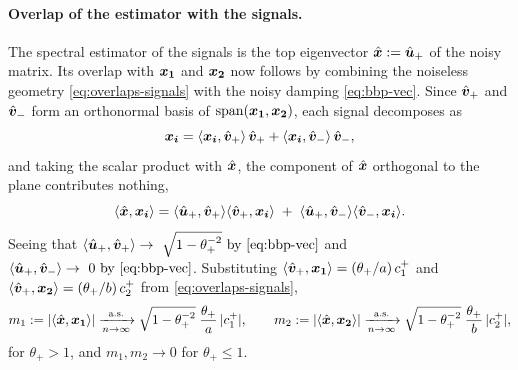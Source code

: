 \documentclass[11pt]{article}
\begin{document}
\paragraph{Overlap of the estimator with the signals.}
The spectral estimator of the signals is the top eigenvector $\hat{\bm{x}} := \hat{\bm{u}}_+$ of the noisy matrix. Its overlap with $\bm{x_1}$ and $\bm{x_2}$ now follows by combining the noiseless geometry \eqref{eq:overlaps-signals} with the noisy damping \eqref{eq:bbp-vec}. Since $\hat{\bm{v}}_+$ and $\hat{\bm{v}}_-$ form an orthonormal basis of $\operatorname{span}(\bm{x_1},\bm{x_2})$, each signal decomposes as
\[
    \bm{x_i} = \langle \bm{x_i}, \hat{\bm{v}}_+\rangle\, \hat{\bm{v}}_+ + \langle \bm{x_i}, \hat{\bm{v}}_-\rangle\, \hat{\bm{v}}_- ,
\]
and taking the scalar product with $\hat{\bm{x}}$, the component of $\hat{\bm{x}}$ orthogonal to the plane contributes nothing,
\[
    \langle \hat{\bm{x}}, \bm{x_i}\rangle
    =\langle \hat{\bm{u}}_+, \hat{\bm{v}}_+\rangle
      \langle \hat{\bm{v}}_+, \bm{x_i}\rangle
    \;+\; \langle \hat{\bm{u}}_+, \hat{\bm{v}}_-\rangle
      \langle \hat{\bm{v}}_-, \bm{x_i}\rangle .
\]
Seeing that $\langle \hat{\bm{u}}_+, \hat{\bm{v}}_+\rangle\to\ \sqrt{1-\theta_+^{-2}}\ \text{by }\eqref{eq:bbp-vec}$ and $\langle \hat{\bm{u}}_+, \hat{\bm{v}}_-\rangle \to\ 0\ \text{by }\eqref{eq:bbp-vec}$. Substituting $\langle \hat{\bm{v}}_+, \bm{x_1}\rangle = (\theta_+/a)\,c_1^+$ and $\langle \hat{\bm{v}}_+, \bm{x_2}\rangle = (\theta_+/b)\,c_2^+$ from \eqref{eq:overlaps-signals},
\begin{equation}
    m_1 := |\langle \hat{\bm{x}}, \bm{x_1}\rangle| \xrightarrow[n\to\infty]{\text{a.s.}} \sqrt{1-\theta_+^{-2}}\;\frac{\theta_+}{a}\,\lvert c_1^+ \rvert ,
    \qquad
    m_2 := |\langle \hat{\bm{x}}, \bm{x_2}\rangle| \xrightarrow[n\to\infty]{\text{a.s.}} \sqrt{1-\theta_+^{-2}}\;\frac{\theta_+}{b}\,\lvert c_2^+ \rvert ,
    \label{eq:m12}
\end{equation}
for $\theta_+ > 1$, and $m_1, m_2 \to 0$ for $\theta_+ \le 1$.
\end{document}
